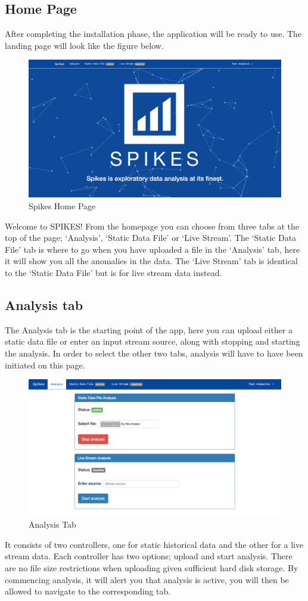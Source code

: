 \documentclass[12pt]{article}
\begin{document}
  \subsection{Home Page}
  After completing the installation phase, the application will be ready to use. The landing page will look like the
  figure below.
  \begin{figure}[H]
  \centering
  \includegraphics[width=120mm]{home.png}
  \caption{Spikes Home Page}
  \end{figure}
  Welcome to SPIKES! From the homepage you can choose from three tabs at the top of the page; ‘Analysis’, ‘Static Data File’ or ‘Live Stream’.
  The ‘Static Data File’ tab is where to go when you have uploaded a file in the ‘Analysis’ tab, here it will show you all the anomalies in the data.
  The ‘Live Stream’ tab is identical to the ‘Static Data File’ but is for live stream data instead.
  \subsection{Analysis tab}
  The Analysis tab is the starting point of the app, here you can upload either a static data file or enter an input stream source, along with stopping and starting the analysis.
  In order to select the other two tabs, analysis will have to have been initiated on this page.
  \begin{figure}[H]
  \centering
  \includegraphics[width=120mm]{analysisTab.png}
  \caption{Analysis Tab}
  \end{figure}
  It consists of two controllers, one for static historical data and the other for a live stream data.
  Each controller has two options; upload and start analysis. There are no file size restrictions when uploading given sufficient hard disk storage.
  By commencing analysis, it will alert you that analysis is active, you will then be allowed to navigate to the corresponding tab.
\end{document}
